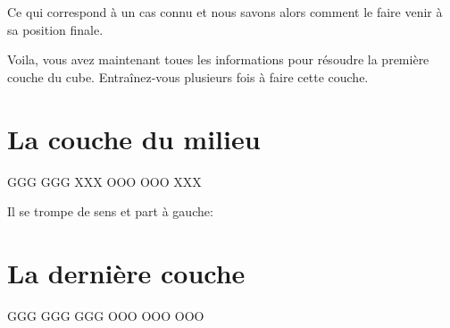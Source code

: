 \documentclass[10pt,paper=a5,pagesize]{scrbook}
\begin{document}
Ce qui correspond à un cas connu et nous savons alors comment le faire
venir à sa position finale.

Voila, vous avez maintenant toues les informations pour résoudre la première
couche du cube. Entraînez-vous plusieurs fois à faire cette couche.

\chapter{La couche du milieu}

{
	\centering
	\RubikFaceRight%
	{G}{G}{G}%
	{G}{G}{G}%
	{X}{X}{X}
	\RubikFaceFront%
	{O}{O}{O}%
	{O}{O}{O}%
	{X}{X}{X}
	\par
}

Il se trompe de sens et part à gauche: 

%
%
%
%
%
%
%

\chapter{La dernière couche}

{
	\centering
	\RubikFaceRight%
	{G}{G}{G}%
	{G}{G}{G}%
	{G}{G}{G}
	\RubikFaceFront%
	{O}{O}{O}%
	{O}{O}{O}%
	{O}{O}{O}
	\par
}
\end{document}
